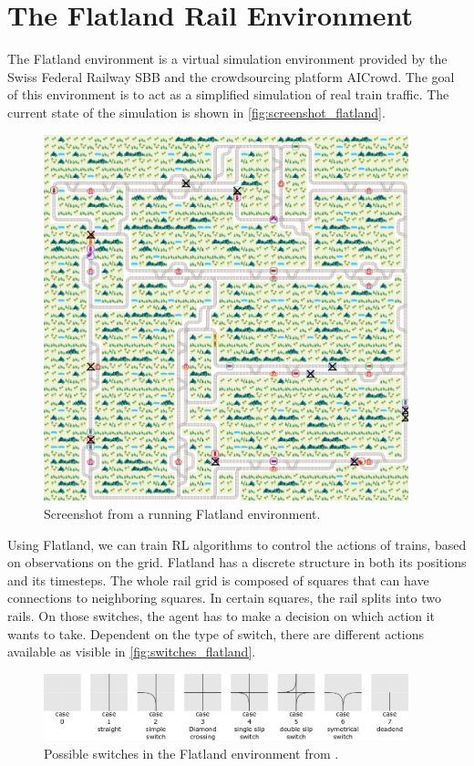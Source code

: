 \section{The Flatland Rail Environment}\label{flatland_intro}
The Flatland environment is a virtual simulation environment provided by the Swiss Federal Railway SBB and the crowdsourcing platform AICrowd.
The goal of this environment is to act as a simplified simulation of real train traffic. The current state of the simulation is shown in \autoref{fig:screenshot_flatland}.
\begin{figure}[H]
	\centering
	\includegraphics[width=300pt]{images/screenshot_flatland.png}
	\caption{Screenshot from a running Flatland environment.}
	\label{fig:screenshot_flatland}
\end{figure}
Using Flatland, we can train RL algorithms to control the actions of trains, based on observations on the grid. Flatland has a discrete structure in both its positions and its timesteps. The whole rail grid is composed of squares that can have connections to neighboring squares. In certain squares, the rail splits into two rails. On those switches, the agent has to make a decision on which action it wants to take. Dependent on the type of switch, there are different actions available as visible in \autoref{fig:switches_flatland}.
\begin{figure}[H]
	\centering
	\includegraphics[width=300pt]{images/transition_nips_proposal.png}
	\caption{Possible switches in the Flatland environment from \cite{flatland_docu}.}
	\label{fig:switches_flatland}
\end{figure}
